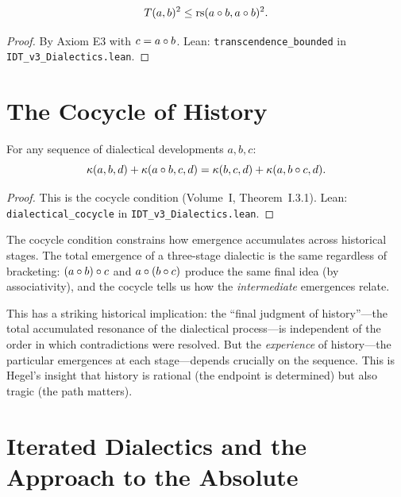 \begin{theorem}
\label{thm:transcendence-bounded}
\[
T(a,b)^2 \leq \mathrm{rs}(a \circ b, a \circ b)^2.
\]
\end{theorem}

\begin{proof}
By Axiom E3 with $c = a \circ b$.
Lean: \texttt{transcendence\_bounded} in \texttt{IDT\_v3\_Dialectics.lean}.
\end{proof}

\section{The Cocycle of History}

\begin{theorem}
\label{thm:dialectical-cocycle}
For any sequence of dialectical developments $a, b, c$:
\[
\kappa(a, b, d) + \kappa(a \circ b, c, d) =
\kappa(b, c, d) + \kappa(a, b \circ c, d).
\]
\end{theorem}

\begin{proof}
This is the cocycle condition (Volume~I, Theorem~I.3.1).
Lean: \texttt{dialectical\_cocycle} in \texttt{IDT\_v3\_Dialectics.lean}.
\end{proof}

\begin{interpretation}
\label{interp:cocycle-history}
The cocycle condition constrains how emergence accumulates across historical
stages. The total emergence of a three-stage dialectic is the same regardless
of bracketing: $(a \circ b) \circ c$ and $a \circ (b \circ c)$
produce the same final idea (by associativity), and the cocycle tells us
how the \emph{intermediate} emergences relate.

This has a striking historical implication: the ``final judgment of history''---the
total accumulated resonance of the dialectical process---is independent of the
order in which contradictions were resolved. But the \emph{experience} of
history---the particular emergences at each stage---depends crucially on the
sequence. This is Hegel's insight that history is rational (the endpoint is
determined) but also tragic (the path matters).
\end{interpretation}

\section{Iterated Dialectics and the Approach to the Absolute}

